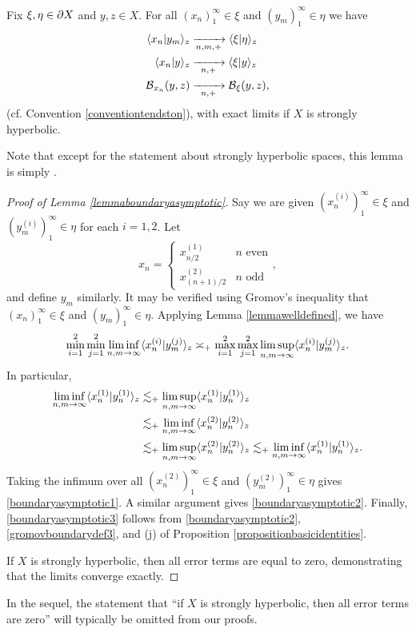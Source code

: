 \begin{lemma}
\label{lemmaboundaryasymptotic}
Fix $\xi,\eta\in\partial X$ and $y,z\in X$. For all $(x_n)_1^\infty\in\xi$ and $(y_m)_1^\infty\in\eta$ we have 
\begin{align} \label{boundaryasymptotic1}
\langle x_n|y_m\rangle_z &\xrightarrow[n,m,+]{} \langle \xi|\eta\rangle_z\\ \label{boundaryasymptotic2}
\langle x_n|y\rangle_z &\xrightarrow[\;\; n,+ \;\;]{} \langle \xi|y\rangle_z\\ \label{boundaryasymptotic3}
\operatorname{\mathcal B}_{x_n}(y,z) &\xrightarrow[\;\; n,+ \;\;]{} \operatorname{\mathcal B}_\xi(y,z),
\end{align}
(cf. Convention \ref{conventiontendston}), with exact limits if $X$ is strongly hyperbolic.
\end{lemma}
Note that except for the statement about strongly hyperbolic spaces, this lemma is simply \cite[Lemma 5.11]{Vaisala}.
\begin{proof}[Proof of Lemma \ref{lemmaboundaryasymptotic}]
Say we are given $(x_n^{(i)})_1^\infty\in \xi$ and $(y_m^{(i)})_1^\infty\in\eta$ for each $i = 1, 2$.
Let
\[
x_n = \begin{cases}
x_{n/2}^{(1)} & n \text{ even}\\
x_{(n + 1)/2}^{(2)} & n \text{ odd}
\end{cases},
\]
and define $y_m$ similarly. It may be verified using Gromov's inequality that $(x_n)_1^\infty\in \xi$ and $(y_m)_1^\infty\in\eta$. Applying Lemma \ref{lemmawelldefined}, we have
\[
\min_{i = 1}^2 \min_{j = 1}^2 \liminf_{n,m\to\infty} \langle x_n^{(i)}|y_m^{(j)}\rangle_z \asymp_+ \max_{i = 1}^2 \max_{j = 1}^2 \limsup_{n,m\to\infty} \langle x_n^{(i)}|y_m^{(j)}\rangle_z .
\]
In particular,
\begin{align*}
\liminf_{n,m\to\infty} \langle x_n^{(1)} | y_n^{(1)} \rangle_z
&\lesssim_+ \limsup_{n,m\to\infty} \langle x_n^{(1)} | y_n^{(1)} \rangle_z\\
&\lesssim_+ \liminf_{n,m\to\infty} \langle x_n^{(2)} | y_n^{(2)} \rangle_z\\
&\lesssim_+ \limsup_{n,m\to\infty} \langle x_n^{(2)} | y_n^{(2)} \rangle_z
\lesssim_+ \liminf_{n,m\to\infty} \langle x_n^{(1)} | y_n^{(1)} \rangle_z.
\end{align*}
Taking the infimum over all $(x_n^{(2)})_1^\infty\in\xi$ and $(y_m^{(2)})_1^\infty\in\eta$ gives \eqref{boundaryasymptotic1}. A similar argument gives \eqref{boundaryasymptotic2}. Finally, \eqref{boundaryasymptotic3} follows from \eqref{boundaryasymptotic2}, \eqref{gromovboundarydef3}, and (j) of Proposition \ref{propositionbasicidentities}.

If $X$ is strongly hyperbolic, then all error terms are equal to zero, demonstrating that the limits converge exactly.
\end{proof}
\begin{remark}
In the sequel, the statement that ``if $X$ is strongly hyperbolic, then all error terms are zero'' will typically be omitted from our proofs.
\end{remark}

